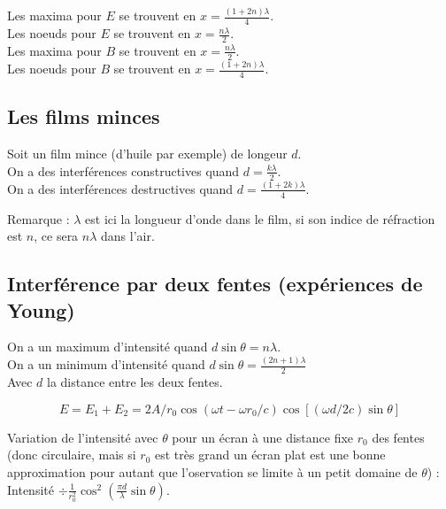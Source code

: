 \documentclass[a4paper,10pt,openright,titlepage]{report}
\begin{document}
Les maxima pour $E$ se trouvent en $x = \frac{(1+2n)\lambda}{4}$.\\

Les noeuds pour $E$ se trouvent en $x = \frac{n \lambda}{2}$.\\

Les maxima pour $B$ se trouvent en $x = \frac{n \lambda}{2}$.\\

Les noeuds pour $B$ se trouvent en $x = \frac{(1+2n)\lambda}{4}$.

\subsection{Les films minces}

Soit un film mince (d'huile par exemple) de longeur $d$.\\

On a des interférences constructives quand $d = \frac{k \lambda}{2}$.\\

On a des interférences destructives quand $d = \frac{(1+2k)\lambda}{4}$.

Remarque : $\lambda$ est ici la longueur d'onde dans le film, si son indice de réfraction est $n$, ce sera $n \lambda$ dans l'air.

\subsection{Interférence par deux fentes (expériences de Young)}

On a un maximum d'intensité quand $d \sin \theta = n \lambda$.\\

On a un minimum d'intensité quand $d \sin \theta = \frac{(2n+1)\lambda}{2}$\\

Avec $d$ la distance entre les deux fentes.

$$E=E_1+E_2 = 2 A / r_0 \cos ( \omega t - \omega r_0 / c) \cos \left[ (\omega d / 2 c) \sin \theta \right]$$

Variation de l'intensité avec $\theta$ pour un écran à une distance fixe $r_0$ des fentes (donc circulaire, mais si $r_0$ est très grand un écran plat est une bonne approximation pour autant que l'oservation se limite à un petit domaine de $\theta$) :\\

Intensité $\div \frac{1}{r_0^2} \cos^2 \left( \frac{\pi d}{\lambda} \sin \theta \right)$.
\end{document}
